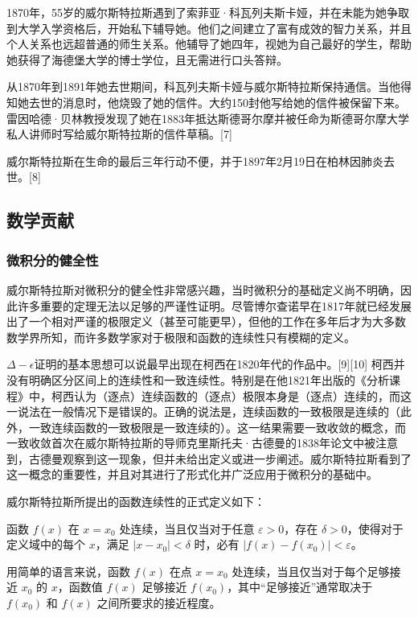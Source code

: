 1870年，55岁的威尔斯特拉斯遇到了索菲亚·科瓦列夫斯卡娅，并在未能为她争取到大学入学资格后，开始私下辅导她。他们之间建立了富有成效的智力关系，并且个人关系也远超普通的师生关系。他辅导了她四年，视她为自己最好的学生，帮助她获得了海德堡大学的博士学位，且无需进行口头答辩。

从1870年到1891年她去世期间，科瓦列夫斯卡娅与威尔斯特拉斯保持通信。当他得知她去世的消息时，他烧毁了她的信件。大约150封他写给她的信件被保留下来。雷因哈德·贝林教授发现了她在1883年抵达斯德哥尔摩并被任命为斯德哥尔摩大学私人讲师时写给威尔斯特拉斯的信件草稿。[7]

威尔斯特拉斯在生命的最后三年行动不便，并于1897年2月19日在柏林因肺炎去世。[8]
\subsection{数学贡献}
\subsubsection{微积分的健全性}  
威尔斯特拉斯对微积分的健全性非常感兴趣，当时微积分的基础定义尚不明确，因此许多重要的定理无法以足够的严谨性证明。尽管博尔查诺早在1817年就已经发展出了一个相对严谨的极限定义（甚至可能更早），但他的工作在多年后才为大多数数学界所知，而许多数学家对于极限和函数的连续性只有模糊的定义。

\(\Delta-\epsilon\)证明的基本思想可以说最早出现在柯西在1820年代的作品中。[9][10] 柯西并没有明确区分区间上的连续性和一致连续性。特别是在他1821年出版的《分析课程》中，柯西认为（逐点）连续函数的（逐点）极限本身是（逐点）连续的，而这一说法在一般情况下是错误的。正确的说法是，连续函数的一致极限是连续的（此外，一致连续函数的一致极限是一致连续的）。这一结果需要一致收敛的概念，而一致收敛首次在威尔斯特拉斯的导师克里斯托夫·古德曼的1838年论文中被注意到，古德曼观察到这一现象，但并未给出定义或进一步阐述。威尔斯特拉斯看到了这一概念的重要性，并且对其进行了形式化并广泛应用于微积分的基础中。

威尔斯特拉斯所提出的函数连续性的正式定义如下：

函数 \( f(x) \) 在 \( x = x_0 \) 处连续，当且仅当对于任意 \( \varepsilon > 0 \)，存在 \( \delta > 0 \)，使得对于定义域中的每个 \( x \)，满足 \( |x - x_0| < \delta \) 时，必有 \( |f(x) - f(x_0)| < \varepsilon \)。

用简单的语言来说，函数 \( f(x) \) 在点 \( x = x_0 \) 处连续，当且仅当对于每个足够接近 \( x_0 \) 的 \( x \)，函数值 \( f(x) \) 足够接近 \( f(x_0) \)，其中“足够接近”通常取决于 \( f(x_0) \) 和 \( f(x) \) 之间所要求的接近程度。

